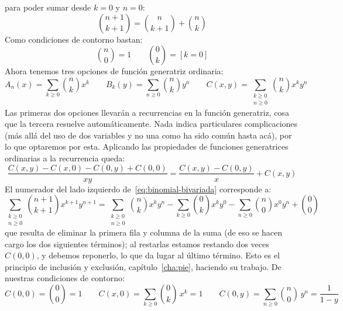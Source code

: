   para poder sumar desde \(k = 0\) y \(n = 0\):
  \begin{equation}
    \label{eq:binomial-recurrencia}
    \binom{n + 1}{k + 1}
      = \binom{n}{k + 1} + \binom{n}{k}
  \end{equation}
  Como condiciones de contorno bastan:
  \begin{equation*}
    \binom{n}{0}
      = 1 \qquad
    \binom{0}{k}
      = [k = 0]
  \end{equation*}
  Ahora tenemos tres opciones de función generatriz ordinaria:
  \begin{equation*}
    A_n(x)
      = \sum_{k \ge 0} \binom{n}{k} x^k
      \qquad
    B_k(y)
      = \sum_{n \ge 0} \binom{n}{k} y^n
      \qquad
    C(x, y)
      = \sum_{\substack{k \ge 0 \\
			n \ge 0}}
	  \binom{n}{k} x^k y^n
  \end{equation*}
  Las primeras dos opciones
  llevarán a recurrencias en la función generatriz,
  cosa que la tercera resuelve automáticamente.
  Nada indica particulares complicaciones
  (más allá del uso de dos variables y no una
   como ha sido común hasta acá),
  por lo que optaremos por esta.
  Aplicando las propiedades de funciones generatrices ordinarias%
  a la recurrencia queda:
  \begin{equation}
    \label{eq:binomial-bivariada}
    \frac{C(x, y) - C(x, 0) - C(0, y) + C(0, 0)}{x y}
      = \frac{C(x, y) - C(0, y)}{x} + C(x, y)
  \end{equation}
  El numerador del lado izquierdo
  de~\eqref{eq:binomial-bivariada} corresponde a:
  \begin{equation*}
    \sum_{\substack{k \ge 0 \\
		    n \ge 0}}
      \binom{n + 1}{k + 1} x^{k + 1} y^{n + 1}
	= \sum_{\substack{k \ge 0 \\
			  n \ge 0}}
		\binom{n}{k} x^k y^n
	    - \sum_{k \ge 0} \binom{0}{k} x^k y^0
	    - \sum_{n \ge 0} \binom{n}{0} x^0 y^n
	    + \binom{0}{0}
  \end{equation*}
  que resulta de eliminar la primera fila y columna de la suma
  (de eso se hacen cargo los dos siguientes términos);
  al restarlas estamos restando dos veces \(C(0, 0)\),
  y debemos reponerlo,
  lo que da lugar al último término.
  Esto es el principio de inclusión y exclusión,%
  capítulo~\ref{cha:pie},
  haciendo su trabajo.
  De nuestras condiciones de contorno:
  \begin{equation*}
    C(0, 0)
      = \binom{0}{0} = 1 \qquad
    C(x, 0)
      = \sum_{k \ge 0} \binom{0}{k} \, x^k = 1 \qquad
    C(0, y)
      = \sum_{n \ge 0} \binom{n}{0} \, y^n = \frac{1}{1 - y}
  \end{equation*}
